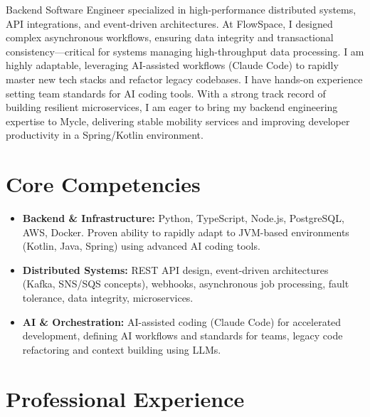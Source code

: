 \documentclass[11pt,a4paper,sans]{moderncv}
\begin{document}
\makecvtitle

Backend Software Engineer specialized in high-performance distributed systems, API integrations, and event-driven architectures. At FlowSpace, I designed complex asynchronous workflows, ensuring data integrity and transactional consistency---critical for systems managing high-throughput data processing. I am highly adaptable, leveraging AI-assisted workflows (Claude Code) to rapidly master new tech stacks and refactor legacy codebases. I have hands-on experience setting team standards for AI coding tools. With a strong track record of building resilient microservices, I am eager to bring my backend engineering expertise to Mycle, delivering stable mobility services and improving developer productivity in a Spring/Kotlin environment.

\section{Core Competencies}
\begin{itemize}
\item \textbf{Backend \& Infrastructure:} Python, TypeScript, Node.js, PostgreSQL, AWS, Docker. Proven ability to rapidly adapt to JVM-based environments (Kotlin, Java, Spring) using advanced AI coding tools.
\item \textbf{Distributed Systems:} REST API design, event-driven architectures (Kafka, SNS/SQS concepts), webhooks, asynchronous job processing, fault tolerance, data integrity, microservices.
\item \textbf{AI \& Orchestration:} AI-assisted coding (Claude Code) for accelerated development, defining AI workflows and standards for teams, legacy code refactoring and context building using LLMs.
\end{itemize}

\section{Professional Experience}
\end{document}
